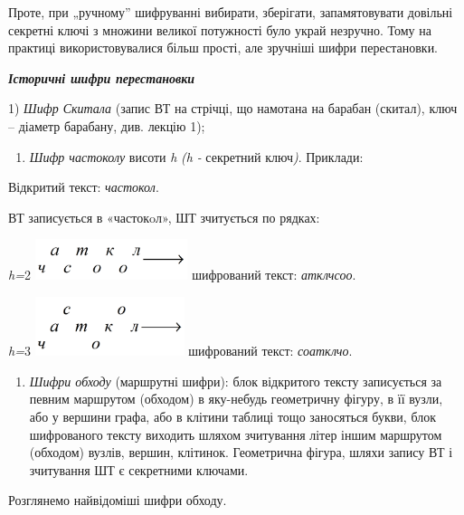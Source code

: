 \documentclass[a4paper]{article}
\newcounter{saveenum}
\newcommand\liststyleWWviiiNumxli{%
\renewcommand\theenumi{\arabic{enumi}}
\renewcommand\theenumii{\alph{enumii}}
\renewcommand\theenumiii{\roman{enumiii}}
\renewcommand\theenumiv{\arabic{enumiv}}
\renewcommand\labelenumi{\theenumi)}
\renewcommand\labelenumii{\theenumii.}
\renewcommand\labelenumiii{\theenumiii.}
\renewcommand\labelenumiv{\theenumiv.}
}
\newcounter{}
\begin{document}
 Проте, при „ручному” шифруванні  вибирати,  зберігати,
запам{\textquotesingle}ятовувати довільні  секретні  ключі з множини великої
потужності було украй незручно.  Тому на практиці використовувалися більш
прості, але зручніші шифри перестановки.


\bigskip


\bigskip

{\centering\bfseries\itshape
Історичні шифри перестановки
\par}


\bigskip


\bigskip

1) \textit{Шифр Скитала} (запис ВТ на стрічці, що намотана на барабан (скитал),
ключ – діаметр барабану, див. лекцію 1);

\liststyleWWviiiNumxli
\begin{enumerate}
\item \textit{Шифр частоколу} висоти \textit{h}\textit{ }\textit{(}\textit{h
}\textit{{}- }секретний\textit{ }ключ\textit{)}. Приклади:
\end{enumerate}
Відкритий текст: \textit{частокол}. 

ВТ записується в «частокoл», ШТ зчитується по рядках:

{\centering
\textit{h}\textit{=}2\textit{  }
\includegraphics[width=1.7598in,height=0.4681in]{crypt-img/crypt-img62.png} 
шифрований текст: \textit{атклчсоо}.
\par}

{\centering
\textit{h}\textit{=}3\textit{  } 
\includegraphics[width=1.7193in,height=0.6799in]{crypt-img/crypt-img63.png} 
шифрований текст: \textit{соатклчо}.
\par}

\liststyleWWviiiNumxli
\setcounter{saveenum}{\value{enumi}}
\begin{enumerate}
\setcounter{enumi}{\value{saveenum}}
\item \textit{Шифри обходу} (маршрутні шифри): блок відкритого тексту
записується за певним маршрутом (обходом) в яку-небудь геометричну фігуру, в її
вузли, або у вершини графа, або в клітини таблиці тощо заносяться букви, блок
шифрованого тексту виходить шляхом зчитування літер іншим маршрутом (обходом)
вузлів, вершин, клітинок. Геометрична фігура, шляхи запису ВТ і зчитування ШТ є
секретними ключами.
\end{enumerate}
 Розглянемо найвідоміші шифри обходу.
\end{document}
